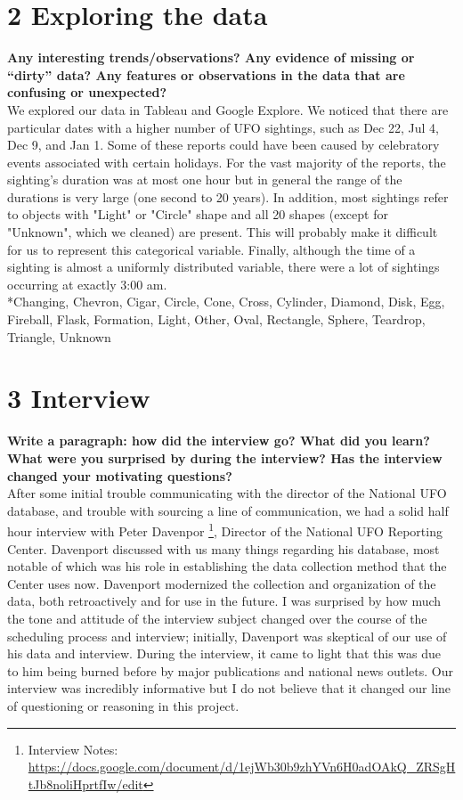 \documentclass{neu_handout}
\begin{document}
\section*{2 Exploring the data}

\textbf{Any interesting
trends/observations? Any evidence of missing or “dirty” data? Any features or
observations in the data that are confusing or unexpected?}\\

We explored our data in Tableau and Google Explore. We noticed that there are particular dates with a higher number of UFO sightings, such as Dec 22, Jul 4, Dec 9, and Jan 1. Some of these reports could have been caused by celebratory events associated with certain holidays. For the vast majority of the reports, the sighting's duration was at most one hour but in general the range of the durations is very large (one second to 20 years). In addition, most sightings refer to objects with "Light" or "Circle" shape and all 20 shapes (except for "Unknown", which we cleaned) are present. This will probably make it difficult for us to represent this categorical variable. Finally, although the time of a sighting is almost a uniformly distributed variable, there were a lot of sightings occurring at exactly 3:00 am.\\

*Changing, Chevron, Cigar, Circle, Cone, Cross, Cylinder, Diamond, Disk, Egg, Fireball, Flask, Formation, Light, Other, Oval, Rectangle, Sphere, Teardrop, Triangle, Unknown


\section*{3 Interview}

\textbf{Write a paragraph: how did the interview go? What did you learn? What were you surprised by during the interview? Has the interview changed your motivating questions?}\\ 

After some initial trouble communicating with the director of the National UFO database, and trouble with sourcing a line of communication, we had a solid half hour interview with Peter Davenpor \footnote{Interview Notes: \url{https://docs.google.com/document/d/1ejWb30b9zhYVn6H0adOAkQ_ZRSgHtJb8noliHprtfIw/edit}}, Director of the National UFO Reporting Center. Davenport discussed with us many things regarding his database, most notable of which was his role in establishing the data collection method that the Center uses now. Davenport modernized the collection and organization of the data, both retroactively and for use in the future. I was surprised by how much the tone and attitude of the interview subject changed over the course of the scheduling process and interview; initially, Davenport was skeptical of our use of his data and interview. During the interview, it came to light that this was due to him being burned before by major publications and national news outlets. Our interview was incredibly informative but I do not believe that it changed our line of questioning or reasoning in this project.\\
\end{document}
